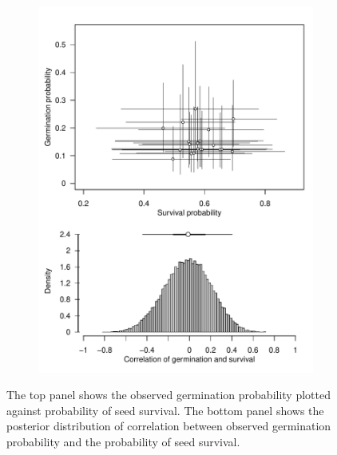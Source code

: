 \documentclass[12pt, oneside, titlepage]{article}   	%
\begin{document}
{ \begin{figure}
\centering
\begin{subfigure}[h]{.65\textwidth}
\centering
       \includegraphics[page=1,width=1\textwidth]{../figures/analysis/correlation-germ-surv.pdf}  
\end{subfigure}
 \caption{ The top panel shows the observed germination probability plotted against probability of seed survival. The bottom panel shows the posterior distribution of correlation between observed germination probability and the probability of seed survival. }
  \label{fig:correlation-germ-surv}
 \end{figure}
 
}
\end{document}
